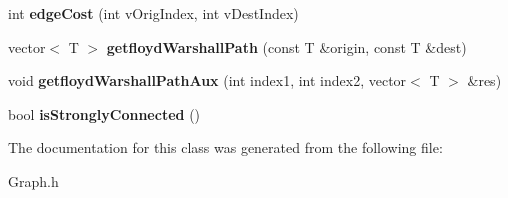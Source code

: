 \begin{DoxyCompactItemize}
int {\bfseries edge\+Cost} (int v\+Orig\+Index, int v\+Dest\+Index)
\item 
\mbox{\label{class_graph_ab23d1dae92a7f2b29dcb91a94336674c}} 
vector$<$ T $>$ {\bfseries getfloyd\+Warshall\+Path} (const T \&origin, const T \&dest)
\item 
\mbox{\label{class_graph_aad1eda4beb8425d03ed1f3b8af397563}} 
void {\bfseries getfloyd\+Warshall\+Path\+Aux} (int index1, int index2, vector$<$ T $>$ \&res)
\item 
\mbox{\label{class_graph_aa3556e07bae6e66908a187dfa43b0eb2}} 
bool {\bfseries is\+Strongly\+Connected} ()
\end{DoxyCompactItemize}


The documentation for this class was generated from the following file\+:\begin{DoxyCompactItemize}
\item 
Graph.\+h\end{DoxyCompactItemize}
